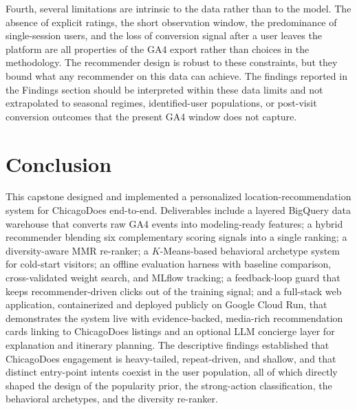 \documentclass[12pt,letterpaper]{article}
\begin{document}
Fourth, several limitations are intrinsic to the data rather than to
the model. The absence of explicit ratings, the short observation
window, the predominance of single-session users, and the loss of
conversion signal after a user leaves the platform are all properties
of the GA4 export rather than choices in the methodology. The
recommender design is robust to these constraints, but they bound
what any recommender on this data can achieve. The findings reported
in the Findings section should be interpreted within these data
limits and not extrapolated to seasonal regimes, identified-user
populations, or post-visit conversion outcomes that the present GA4
window does not capture.

\section{Conclusion}\label{sec:conclusion}

This capstone designed and implemented a personalized
location-recommendation system for ChicagoDoes end-to-end.
Deliverables include a layered BigQuery data warehouse that converts
raw GA4 events into modeling-ready features; a hybrid recommender
blending six complementary scoring signals into a single ranking; a
diversity-aware MMR re-ranker; a $K$-Means-based behavioral archetype
system for cold-start visitors; an offline evaluation harness with
baseline comparison, cross-validated weight search, and MLflow
tracking; a feedback-loop guard that keeps recommender-driven clicks
out of the training signal; and a full-stack web application,
containerized and deployed publicly on Google Cloud Run, that
demonstrates the system live with evidence-backed, media-rich
recommendation cards linking to ChicagoDoes listings and an optional
LLM concierge layer for explanation and itinerary planning. The
descriptive findings established that
ChicagoDoes engagement is heavy-tailed, repeat-driven, and shallow,
and that distinct entry-point intents coexist in the user
population, all of which directly shaped the design of the popularity
prior, the strong-action classification, the behavioral archetypes,
and the diversity re-ranker.
\end{document}
